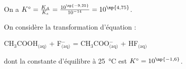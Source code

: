 \begin{corrige}
On a $K^\circ=\frac{K_A}{K_e}=\frac{10^{\np{-9,25}}}{10^{-14}}=10^{\np{4,75}}$.
\end{corrige}






\finEntrainement













\hauteurLargeurCadreReponse		{6mm}{12mm}
\initialisationEntrainement

On considère la transformation d'équation : \vspace{-.5mm}
\begin{center}
{CH$_3$COOH}$_\text{(aq)}$ + F$^-_\text{(aq)}$ = CH$_3$COO$^-_\text{(aq)}$ + HF$_\text{(aq)}$\vspace{-.5mm}
\end{center}
dont la constante d'équilibre à \SI{25}{\celsius} est $K^\circ=10^{\np{-1,6}}$.

